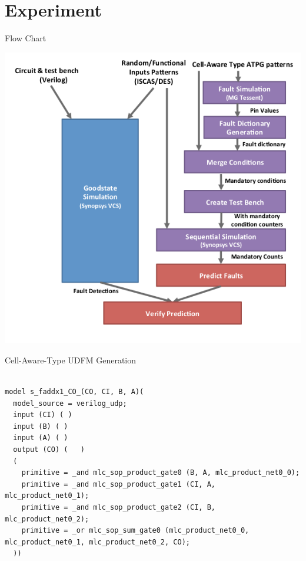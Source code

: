 \documentclass{beamer}
\begin{document}
\section{Experiment}
\frame{\tableofcontents[currentsection]}
\begin{frame}{Flow Chart}
\begin{center}
\includegraphics[scale = 0.3]{Images/flowDiagram.png}
\end{center}
\end{frame}

\begin{frame}[fragile]{Cell-Aware-Type UDFM Generation}
\lstset{breaklines=true, basicstyle=\ttfamily\scriptsize}\vspace{-1em}
\begin{lstlisting}[frame=single]

model s_faddx1_CO_(CO, CI, B, A)(
  model_source = verilog_udp;
  input (CI) ( )
  input (B) ( )
  input (A) ( )
  output (CO) (   )
  (
    primitive = _and mlc_sop_product_gate0 (B, A, mlc_product_net0_0);
    primitive = _and mlc_sop_product_gate1 (CI, A, mlc_product_net0_1);
    primitive = _and mlc_sop_product_gate2 (CI, B, mlc_product_net0_2);
    primitive = _or mlc_sop_sum_gate0 (mlc_product_net0_0, mlc_product_net0_1, mlc_product_net0_2, CO);
  ))
\end{lstlisting}

\end{frame}
\end{document}
